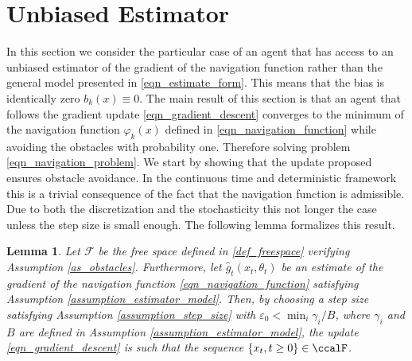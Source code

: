 \documentclass[article]{IEEEtran}
\newtheorem{lemma}{Lemma}
\theoremstyle{definition}
\begin{document}
\section{Unbiased Estimator}\label{sec_unbiased}
In this section we consider the particular case of an agent that has access to an unbiased estimator of the gradient of the navigation function rather than the general model presented in \eqref{eqn_estimate_form}. This means that the bias is identically zero $b_k(x)\equiv 0$. The main result of this section is that an agent that follows the gradient update \eqref{eqn_gradient_descent} converges to the minimum of the navigation function $\varphi_k(x)$ defined in \eqref{eqn_navigation_function} while avoiding the obstacles with probability one. Therefore solving problem \eqref{eqn_navigation_problem}. We start by showing that the update proposed ensures obstacle avoidance. In the continuous time and deterministic framework this is a trivial consequence of the fact that the navigation function is admissible. Due to both the discretization  and the stochasticity this not longer the case unless the step size is small enough. The following lemma formalizes this result.
\begin{lemma}\label{lemma_non_collision}
Let $\mathcal{F}$ be the free space defined in \eqref{def_freespace} verifying Assumption \ref{as_obstacles}. Furthermore, let $\hat{g}_t(x_t,\theta_t)$ be an estimate of the gradient of the navigation function \eqref{eqn_navigation_function} satisfying Assumption \ref{assumption_estimator_model}. Then, by choosing a step size satisfying Assumption \ref{assumption_step_size} with $\varepsilon_0<\min_i\gamma_i/B$, where $\gamma_i$ and $B$ are defined in Assumption \ref{assumption_estimator_model}, the update \eqref{eqn_gradient_descent} is such that the sequence $\left\{x_t,t\geq0 \right\}\in \ccalF$.
\end{lemma}
%
\end{document}

